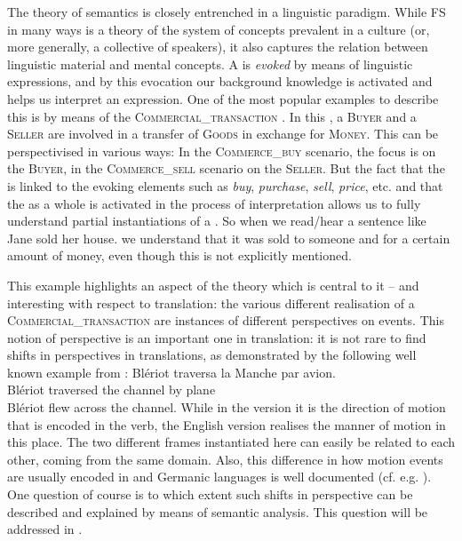 \documentclass[output=paper]{LSP/langsci}
\begin{document}
\noindent The theory of  semantics is closely entrenched in a linguistic paradigm. While FS in many ways is a theory of the system of concepts prevalent in a culture (or, more generally, a collective of speakers), it also captures the relation between linguistic material and mental concepts. A  is \textit{evoked} by means of linguistic expressions, and by this evocation our background knowledge is activated and helps us interpret an expression. One of the most popular examples to describe this is by means of the \textsc{Commercial\_transaction} . In this , a \textsc{Buyer} and a \textsc{Seller} are involved in a transfer of \textsc{Goods} in exchange for \textsc{Money}. This  can be perspectivised in various ways: In the \textsc{Commerce\_buy} scenario, the focus is on the \textsc{Buyer}, in the \textsc{Commerce\_sell} scenario on the \textsc{Seller}. But the fact that the  is linked to the evoking elements such as \textit{buy}, \textit{purchase}, \textit{sell}, \textit{price}, etc. and that the  as a whole is activated in the process of interpretation allows us to fully understand partial instantiations of a . So when we read/hear a sentence like 
\ea\label{czulo:ex:2}
Jane sold her house.
\z
we understand that it was sold to someone and for a certain amount of money, even though this is not explicitly mentioned.

This example highlights an aspect of the theory which is central to it -- and interesting with respect to translation: the various different realisation of a \textsc{Commercial\_transaction} are instances of different perspectives on events. This notion of perspective is an important one in translation: it is not rare to find shifts in perspectives in translations, as demonstrated by the following well known example from \citet[104]{Vinay1995}: 
\ea\label{czulo:ex:3}
\gll Blériot traversa la Manche par avion. \\
 Blériot traversed the channel by plane \\
\glt Blériot flew across the channel.
\z
While in the  version it is the direction of motion that is encoded in the verb, the English version realises the manner of motion in this place. The two different frames instantiated here can easily be related to each other, coming from the same domain. Also, this difference in how motion events are usually encoded in  and Germanic languages is well documented (cf. e.g. \citealt{Talmy2000, Slobin2004}). One question of course is to which extent such shifts in perspective can be described and explained by means of  semantic analysis. This question will be addressed in .
\end{document}
